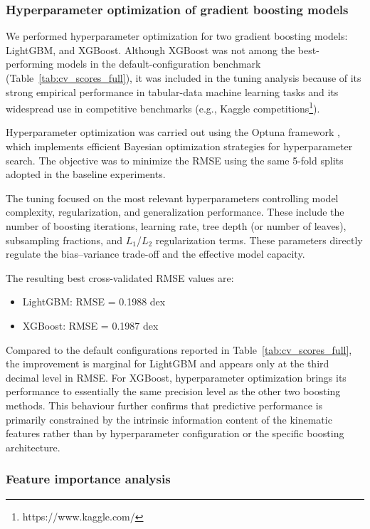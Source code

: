 \documentclass{aa}
\begin{document}
\begin{appendix}
\subsubsection{Hyperparameter optimization of gradient boosting models}

We performed hyperparameter optimization for two gradient boosting models: LightGBM, and XGBoost. Although XGBoost was not among the best-performing models in the default-configuration benchmark (Table~\ref{tab:cv_scores_full}), it was included in the tuning analysis because of its strong empirical performance in tabular-data machine learning tasks and its widespread use in competitive benchmarks (e.g., Kaggle competitions\footnote{https://www.kaggle.com/}).

Hyperparameter optimization was carried out using the Optuna framework \citep{Akiba-19}, which implements efficient Bayesian optimization strategies for hyperparameter search. The objective was to minimize the RMSE using the same 5-fold splits adopted in the baseline experiments.

The tuning focused on the most relevant hyperparameters controlling model complexity, regularization, and generalization performance. These include the number of boosting iterations, learning rate, tree depth (or number of leaves), subsampling fractions, and $L_1$/$L_2$ regularization terms. These parameters directly regulate the bias–variance trade-off and the effective model capacity.


The resulting best cross-validated RMSE values are:

\begin{itemize}
\item LightGBM: RMSE = 0.1988 dex
\item XGBoost: RMSE = 0.1987 dex
\end{itemize}

Compared to the default configurations reported in Table~\ref{tab:cv_scores_full}, the improvement is marginal for LightGBM and appears only at the third decimal level in RMSE. For XGBoost, hyperparameter optimization brings its performance to essentially the same precision level as the other two boosting methods. This behaviour further confirms that predictive performance is primarily constrained by the intrinsic information content of the kinematic features rather than by hyperparameter configuration or the specific boosting architecture.



\subsubsection{Feature importance analysis} \label{appendix:feature_importance_feh}



\end{appendix}
\end{document}
